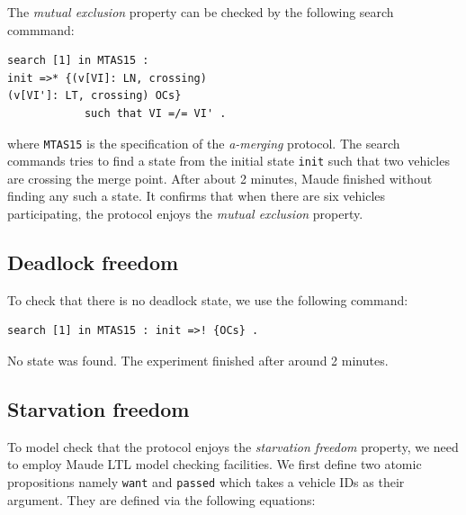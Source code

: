 \documentclass[10pt, conference, compsocconf]{IEEEtran}
\begin{document}
The \textit{mutual exclusion} property can be checked by the following search commmand:

\begin{small}
\begin{verbatim}
search [1] in MTAS15 : 
init =>* {(v[VI]: LN, crossing) 
(v[VI']: LT, crossing) OCs} 
            such that VI =/= VI' .
\end{verbatim}
\end{small}

\noindent
where \verb!MTAS15! is the specification of the \textit{a-merging} protocol.
The search commands tries to find a state from the initial state \verb!init! such that two vehicles are crossing the merge point.
After about 2 minutes, Maude finished without finding any such a state.
It confirms that when  there are six vehicles participating, the protocol enjoys the \textit{mutual exclusion} property.

\subsection{Deadlock freedom}
To check that there is no deadlock state, we use the following command:

\begin{small}
\begin{verbatim}
search [1] in MTAS15 : init =>! {OCs} .
\end{verbatim}
\end{small}

\noindent
No state was found. The experiment finished after around 2 minutes.


\subsection{Starvation freedom}
To model check that the protocol enjoys the \textit{starvation freedom} property, we need to employ Maude LTL model checking facilities.
We first define two atomic propositions namely \verb!want! and \verb!passed! which takes a vehicle IDs as their argument. 
They are defined via the following equations:
\end{document}
